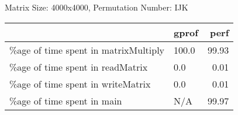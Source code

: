 \documentclass{article}
\begin{document}
    Matrix Size: 4000x4000, Permutation Number: IJK \\
    \begin{tabular}{llr}
\hline
                                      & gprof   &   perf \\
\hline
 \%age of time spent in matrixMultiply & 100.0   &  99.93 \\
 \%age of time spent in readMatrix     & 0.0     &   0.01 \\
 \%age of time spent in writeMatrix    & 0.0     &   0.01 \\
 \%age of time spent in main           & N/A     &  99.97 \\
\hline
\end{tabular}
    
\end{document}
